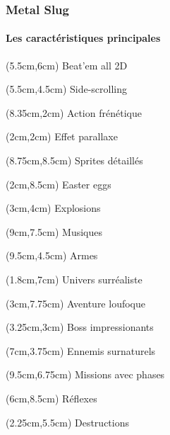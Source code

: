 \begin{frame}
	
	\frametitle{Metal Slug}
	\framesubtitle{Les caractéristiques principales}
	
	{
		\begin{textblock*}{5cm}(5.5cm,6cm)
			{\LARGE Beat'em all 2D}
		\end{textblock*}
		\begin{textblock*}{5cm}(5.5cm,4.5cm)
			{\LARGE Side-scrolling}
		\end{textblock*}
		\begin{textblock*}{5cm}(8.35cm,2cm)
			{\LARGE Action frénétique}
		\end{textblock*}
		\begin{textblock*}{5cm}(2cm,2cm)
			{\LARGE Effet parallaxe}
		\end{textblock*}
		\begin{textblock*}{5cm}(8.75cm,8.5cm)
			{\LARGE Sprites détaillés}
		\end{textblock*}
		\begin{textblock*}{5cm}(2cm,8.5cm)
			{\LARGE Easter eggs}
		\end{textblock*}
	
		\begin{textblock*}{5cm}(3cm,4cm)
			{\large Explosions}
		\end{textblock*}
		\begin{textblock*}{5cm}(9cm,7.5cm)
			{\large Musiques}
		\end{textblock*}
		\begin{textblock*}{5cm}(9.5cm,4.5cm)
			{\large Armes}
		\end{textblock*}
	
		\begin{textblock*}{5cm}(1.8cm,7cm)
			{\small Univers surréaliste}
		\end{textblock*}
		\begin{textblock*}{5cm}(3cm,7.75cm)
			{\small Aventure loufoque}
		\end{textblock*}
		\begin{textblock*}{5cm}(3.25cm,3cm)
			{\small Boss impressionants}
		\end{textblock*}
		\begin{textblock*}{5cm}(7cm,3.75cm)
			{\small Ennemis surnaturels}
		\end{textblock*}
	
		\begin{textblock*}{5cm}(9.5cm,6.75cm)
			{\scriptsize Missions avec phases}
		\end{textblock*}
		\begin{textblock*}{5cm}(6cm,8.5cm)
			{\scriptsize Réflexes}
		\end{textblock*}
		\begin{textblock*}{5cm}(2.25cm,5.5cm)
			{\scriptsize Destructions}
		\end{textblock*}
	}
	
\end{frame}
